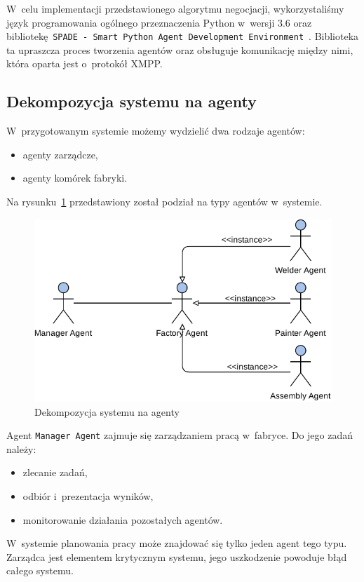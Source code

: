 W~celu implementacji przedstawionego algorytmu negocjacji, wykorzystaliśmy język programowania ogólnego przeznaczenia Python w~wersji 3.6 oraz bibliotekę \texttt{SPADE - Smart Python Agent Development Environment}~\cite{spade}. Biblioteka ta upraszcza proces tworzenia agentów oraz obsługuje komunikację między nimi, która oparta jest o~protokół XMPP.

\subsection{Dekompozycja systemu na agenty}
W~przygotowanym systemie możemy wydzielić dwa rodzaje agentów:
\begin{itemize}
    \item agenty zarządcze,
    \item agenty komórek fabryki. 
\end{itemize}

Na rysunku~\ref{fig:agents} przedstawiony został podział na typy agentów w~systemie.

\begin{figure}[h]
    \centering
    \includegraphics[width=\columnwidth]{figures/SAG-Agents.pdf}
    \caption{Dekompozycja systemu na agenty}
    \label{fig:agents}
\end{figure}

Agent \texttt{Manager Agent} zajmuje się zarządzaniem pracą w~fabryce. Do jego zadań należy:
\begin{itemize}
    \item zlecanie zadań,
    \item odbiór i~prezentacja wyników,
    \item monitorowanie działania pozostałych agentów.
\end{itemize}
W~systemie planowania pracy może znajdować się tylko jeden agent tego typu. Zarządca jest elementem krytycznym systemu, jego uszkodzenie powoduje błąd całego systemu.

